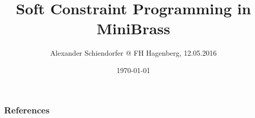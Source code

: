 \documentclass[handout,10pt,xcolor={dvipsnames},fleqn]{beamer}
\title{Soft Constraint Programming in MiniBrass}
\author{Alexander Schiendorfer @ FH Hagenberg, 12.05.2016}
\date{\today}
\begin{document}
\titleframe

% 


\begin{frame}[allowframebreaks]
        \frametitle{References}
        
        
\end{frame}
\end{document}
